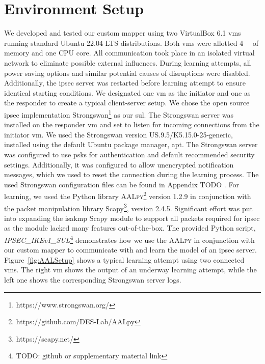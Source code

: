 \section{Environment Setup} \label{sec:learnenv}
We developed and tested our custom mapper using two VirtualBox 6.1 \acp{vm} running standard Ubuntu 22.04 LTS distributions. Both \acp{vm} were allotted \SI{4}{\giga\byte} of memory and one CPU core. All communication took place in an isolated virtual network to eliminate possible external influences. During learning attempts, all power saving options and similar potential causes of disruptions were disabled. Additionally, the \ac{ipsec} server was restarted before learning attempt to ensure identical starting conditions. We designated one \ac{vm} as the initiator and one as the responder to create a typical client-server setup. We chose the open source \ac{ipsec} implementation Strongswan\footnote{https://www.strongswan.org/} as our \ac{sul}. The Strongswan server was installed on the responder \ac{vm} and set to listen for incoming connections from the initiator \ac{vm}. We used the Strongswan version US.9.5/K5.15.0-25-generic, installed using the default Ubuntu package manager, apt. The Strongswan server was configured to use \acp{psk} for authentication and default recommended security settings. Additionally, it was configured to allow unencrypted notification messages, which we used to reset the connection during the learning process. The used Strongswan configuration files can be found in Appendix TODO . For learning, we used the Python library \textsc{AALpy}\footnote{https://github.com/DES-Lab/AALpy} version 1.2.9 in conjunction with the packet manipulation library Scapy\footnote{https://scapy.net/}, version 2.4.5. Significant effort was put into expanding the \ac{isakmp} Scapy module to support all packets required for \ac{ipsec} as the module lacked many features out-of-the-box. The provided Python script, \emph{IPSEC\_IKEv1\_SUL}\footnote{TODO: github or supplementary material link} demonstrates how we use the \textsc{AALpy} in conjunction with our custom mapper to communicate with and learn the model of an \ac{ipsec} server. Figure~\ref{fig:AALSetup} shows a typical learning attempt using two connected \acp{vm}. The right \ac{vm} shows the output of an underway learning attempt, while the left one shows the corresponding Strongswan server logs.
\fi

